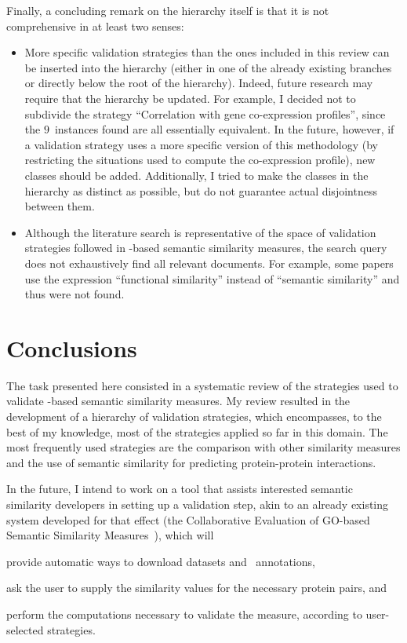 Finally, a concluding remark on the hierarchy itself is that it is not comprehensive in at least two senses:
\begin{itemize}
    \item More specific validation strategies than the ones included in this review can be inserted into the hierarchy (either in one of the already existing branches or directly below the root of the hierarchy). Indeed, future research may require that the hierarchy be updated. For example, I decided not to subdivide the strategy ``Correlation with gene co-expression profiles'', since the $9$~instances found are all essentially equivalent. In the future, however, if a validation strategy uses a more specific version of this methodology (\eg by restricting the situations used to compute the co-expression profile), new classes should be added. Additionally, I tried to make the classes in the hierarchy as distinct as possible, but do not guarantee actual disjointness between them.
    
    \item Although the literature search is representative of the space of validation strategies followed in -based semantic similarity measures, the search query does not exhaustively find all relevant documents. For example, some papers use the expression ``functional similarity'' instead of ``semantic similarity'' and thus were not found.
\end{itemize}


\section{Conclusions} \label{sec:validation/conclusions}

The task presented here consisted in a systematic review of the strategies used to validate -based semantic similarity measures. My review resulted in the development of a hierarchy of validation strategies, which encompasses, to the best of my knowledge, most of the strategies applied so far in this domain. The most frequently used strategies are the comparison with other similarity measures and the use of semantic similarity for predicting protein-protein interactions.

In the future, I intend to work on a tool that assists interested semantic similarity developers in setting up a validation step, akin to an already existing system developed for that effect (the Collaborative Evaluation of GO-based Semantic Similarity Measures~\citep{Pesquita2009a}), which will
\begin{paralist}
    \item provide automatic ways to download datasets and ~annotations,
    \item ask the user to supply the similarity values for the necessary protein pairs, and
    \item perform the computations necessary to validate the measure, according to user-selected strategies.
\end{paralist}

